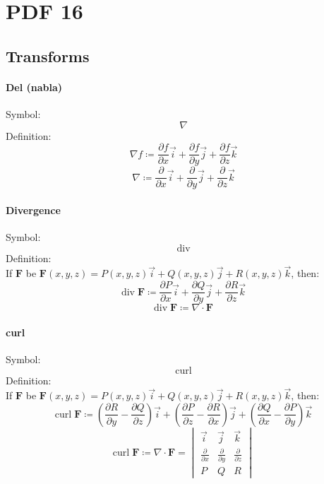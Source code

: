 \documentclass[12pt, fleqn]{book}
\newcommand{\F}{\mathbf{F}}
\newcommand{\Curl}{\mathrm{curl}}
\newcommand{\Div}{\mathrm{div}}
\newcommand{\xyz}{(x, y, z)}
\newcommand{\rond}[2]{\frac{\partial #1}{\partial #2}}
\begin{document}
\chapter{PDF 16}\label{pdf16}
	\section{Transforms}
		\subsubsection{Del (nabla)}
			Symbol:
			\begin{equation}
				\nabla
			\end{equation}
			Definition:
			\begin{equation}
				\nabla f \coloneqq \rond{f}{x}\vec{i} + \rond{f}{y}\vec{j} + \rond{f}{z}\vec{k}
			\end{equation}
			\begin{equation}
				\nabla \coloneqq \rond{}{x}\vec{i} + \rond{}{y}\vec{j} + \rond{}{z}\vec{k}
			\end{equation}
		\subsubsection{Divergence}
			Symbol:
			\begin{equation}
				\Div
			\end{equation}
			Definition: \\
			If $\F$ be $\F\xyz = P\xyz\vec{i} + Q\xyz\vec{j} + R\xyz\vec{k}$, then:
			\begin{equation}
				\Div \; \F \coloneqq \rond{P}{x}\vec{i} + \rond{Q}{y}\vec{j} + \rond{R}{z}\vec{k}
			\end{equation}
			\begin{equation}
				\Div \; \F \coloneqq \nabla \cdot \F
			\end{equation}
		\subsubsection{curl}
			Symbol:
			\begin{equation}
				\Curl
			\end{equation}
			Definition: \\
			If $\F$ be $\F\xyz = P\xyz\vec{i} + Q\xyz\vec{j} + R\xyz\vec{k}$, then:
			\begin{equation}
				\Curl \; \F \coloneqq (\rond{R}{y} - \rond{Q}{z})\vec{i} + (\rond{P}{z} - \rond{R}{x})\vec{j} + (\rond{Q}{x} - \rond{P}{y})\vec{k} 
			\end{equation}
			\begin{equation}
				\Curl \; \F \coloneqq \nabla \cdot \F = 
				\begin{vmatrix}
					\vec{i} & \vec{j} & \vec{k} \\
					\rond{}{x} &  \rond{}{y} & \rond{}{z} \\
					P & Q & R
				\end{vmatrix}
			\end{equation}
\end{document}
